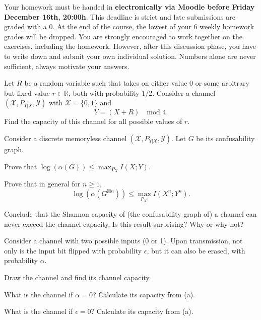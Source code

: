 \documentclass[a4paper,10pt,landscape,twocolumn]{scrartcl}
\newcommand\deadline{Friday December 16th, 20:00h}
\begin{document}
\homeworkproblems

{\sffamily\noindent
Your homework must be handed in \textbf{electronically via Moodle before \deadline}. This deadline is strict and late submissions are graded with a 0. At the end of the course, the lowest of your 6 weekly homework grades will be dropped. You are strongly encouraged to work together on the exercises, including the homework. However, after this discussion phase, you have to write down and submit your own individual solution. Numbers alone are never sufficient, always motivate your answers.
}

\begin{exercise}
Let $R$ be a random variable such that takes on either value 0 or some arbitrary but fixed value $r \in \mathbb{R}$, both with probability 1/2. Consider a channel $(\mathcal{X},P_{Y|X},\mathcal{Y})$ with $\mathcal{X} = \{0,1\}$ and 
\[Y = (X + R) \quad \mbox{mod 4}. \]
Find the capacity of this channel for all possible values of $r$.
\end{exercise}


\begin{exercise}
Consider a discrete memoryless channel $(\mathcal{X}, P_{Y|X}, \mathcal{Y})$. Let $G$ be its confusability graph.
\begin{subex}[(2pt)]
Prove that $\log(\alpha(G)) \leq \max_{P_X} I(X;Y)$.
\end{subex}
\begin{subex}[(2pt)]
Prove that in general for $n \geq 1$, \[\log(\alpha(G^{\boxtimes n})) \leq \max_{P_{X^n}} I(X^n ; Y^n).\]
\end{subex}
\begin{subex}[(1pt)]
Conclude that the Shannon capacity of (the confusability graph of) a channel can never exceed the channel capacity. Is this result surprising? Why or why not?
\end{subex}

\end{exercise}

\begin{exercise}
Consider a channel with two possible inputs (0 or 1). Upon transmission, not only is the input bit flipped with probability $\epsilon$, but it can also be erased, with probability $\alpha$.
	\begin{subex}[(3pt)]
	Draw the channel and find its channel capacity.
	\end{subex}
	\begin{subex}[(1pt)]
	What is the channel if $\alpha = 0$? Calculate its capacity from (a).
	\end{subex}
	\begin{subex}[(1pt)]
	What is the channel if $\epsilon = 0$? Calculate its capacity from (a).
	\end{subex}
\end{exercise}
\end{document}
